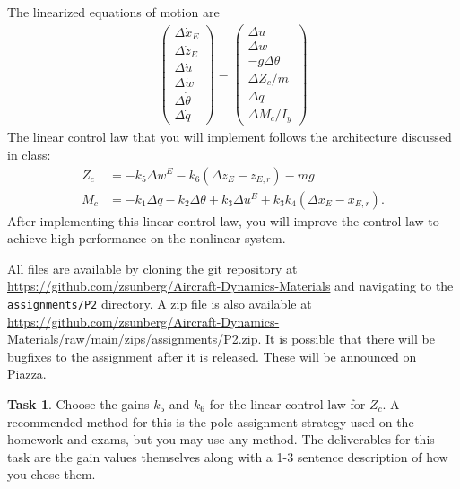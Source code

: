 \documentclass{article}
\theoremstyle{definition}
\newtheorem{task}{Task}
\begin{document}
The linearized equations of motion are
    \begin{align*}
        \begin{pmatrix}
            \Delta \dot{x}_E \\
            \Delta \dot{z}_E \\
            \Delta \dot{u} \\
            \Delta \dot{w} \\
            \Delta \dot{\theta} \\
            \Delta \dot{q}
        \end{pmatrix}
        =
        \begin{pmatrix}
            \Delta u \\
            \Delta w \\
            -g \Delta \theta \\
            \Delta Z_c / m \\
            \Delta q \\
            \Delta M_c / I_y
        \end{pmatrix}
    \end{align*}
The linear control law that you will implement follows the architecture discussed in class:
    \begin{align*}
        Z_c &= -k_5 \Delta w^E -k_6 (\Delta z_E - z_{E,r}) -mg \\
        M_c &= -k_1 \Delta q -k_2 \Delta \theta +k_3 \Delta u^E + k_3 k_4 (\Delta x_E - x_{E,r}) \text{.}
    \end{align*}
After implementing this linear control law, you will improve the control law to achieve high performance on the nonlinear system.

All files are available by cloning the git repository at \url{https://github.com/zsunberg/Aircraft-Dynamics-Materials} and navigating to the \texttt{assignments/P2} directory. A zip file is also available at \url{https://github.com/zsunberg/Aircraft-Dynamics-Materials/raw/main/zips/assignments/P2.zip}. It is possible that there will be bugfixes to the assignment after it is released. These will be announced on Piazza. %

\begin{task}
    Choose the gains $k_5$ and $k_6$ for the linear control law for $Z_c$. A recommended method for this is the pole assignment strategy used on the homework and exams, but you may use any method. The deliverables for this task are the gain values themselves along with a 1-3 sentence description of how you chose them.
\end{task}
\end{document}
